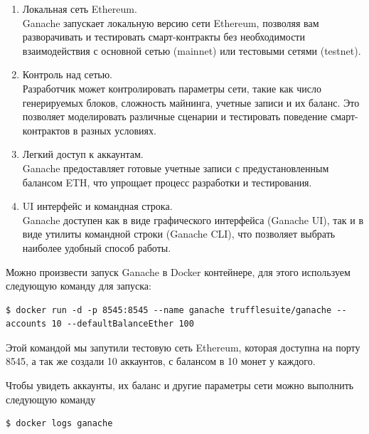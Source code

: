 \begin{enumerate}

\item Локальная сеть Ethereum.\\
Ganache запускает локальную версию сети Ethereum, позволяя вам разворачивать и тестировать смарт-контракты без необходимости взаимодействия с основной сетью (mainnet) или тестовыми сетями (testnet).

\item Контроль над сетью.\\
Разработчик может контролировать параметры сети, такие как число генерируемых блоков, сложность майнинга, учетные записи и их баланс. Это позволяет моделировать различные сценарии и тестировать поведение смарт-контрактов в разных условиях.

\item Легкий доступ к аккаунтам.\\
Ganache предоставляет готовые учетные записи с предустановленным балансом ETH, что упрощает процесс разработки и тестирования.

\item UI интерфейс и командная строка.\\
Ganache доступен как в виде графического интерфейса (Ganache UI), так и в виде утилиты командной строки (Ganache CLI), что позволяет выбрать наиболее удобный способ работы.

\end{enumerate}

Можно произвести запуск Ganache в Docker контейнере, для этого используем следующую команду для запуска:

\begin{lstlisting}[style=CommandLineStyle, belowskip=-2 \baselineskip]
$ docker run -d -p 8545:8545 --name ganache trufflesuite/ganache --accounts 10 --defaultBalanceEther 100
\end{lstlisting}
\vspace{-10pt}

Этой командой мы запутили тестовую сеть Ethereum, которая доступна на порту 8545, а так же создали 10 аккаунтов, с балансом в 10 монет у каждого.

Чтобы увидеть аккаунты, их баланс и другие параметры сети можно выполнить следующую команду 

\begin{lstlisting}[style=CommandLineStyle, belowskip=-2 \baselineskip]
$ docker logs ganache
\end{lstlisting}

